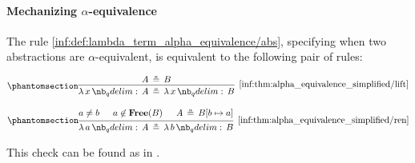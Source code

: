 \paragraph{Mechanizing \( \alpha \)-equivalence}

\begin{proposition}\label{thm:alpha_equivalence_simplified}
  The rule \ref{inf:def:lambda_term_alpha_equivalence/abs}, specifying when two abstractions are \( \alpha \)-equivalent, is equivalent to the following pair of rules:
  \begin{paracol}{2}
    \begin{leftcolumn}
      \begin{equation*}\taglabel[\ensuremath{ \logic{Lift}_\alpha }]{inf:thm:alpha_equivalence_simplified/lift}
        \begin{prooftree}
          \hypo{ A \aequiv B }
          \infer1[\ref{inf:thm:alpha_equivalence_simplified/lift}]{ \qabs x A \aequiv \qabs x B }
        \end{prooftree}
      \end{equation*}
    \end{leftcolumn}
    \begin{rightcolumn}
      \begin{equation*}\taglabel[\ensuremath{ \logic{Ren}_\alpha }]{inf:thm:alpha_equivalence_simplified/ren}
        \begin{prooftree}
          \hypo{ a \neq b }
          \hypo{ a \not\in \op*{Free}(B) }
          \hypo{ A \aequiv B[b \mapsto a] }
          \infer3[\ref{inf:thm:alpha_equivalence_simplified/ren}]{ \qabs a A \aequiv \qabs b B }
        \end{prooftree}
      \end{equation*}
    \end{rightcolumn}
  \end{paracol}
\end{proposition}
\begin{comments}
  \item This check can be found as  in \cite{notebook:code}.
\end{comments}

